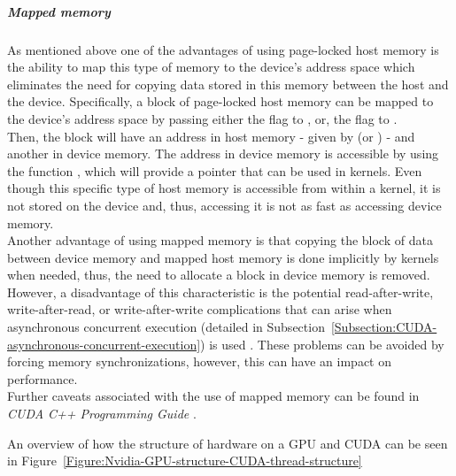 \subparagraph{Mapped memory}
As mentioned above one of the advantages of using page-locked host memory is the ability to map this type of memory to the device's address space which eliminates the need for copying data stored in this memory between the host and the device. Specifically, a block of page-locked host memory can be mapped to the device's address space by passing either the  flag to , or, the  flag to  \cite{NVIDIAMay2022}. \\
Then, the block will have an address in host memory - given by  (or ) - and another in device memory. The address in device memory is accessible by using the function , which will provide a pointer that can be used in kernels. Even though this specific type of host memory is accessible from within a kernel, it is not stored on the device and, thus, accessing it is not as fast as accessing device memory. \\
Another advantage of using mapped memory is that copying the block of data between device memory and mapped host memory is done implicitly by kernels when needed, thus, the need to allocate a block in device memory is removed. However, a disadvantage of this characteristic is the potential read-after-write, write-after-read, or write-after-write complications that can arise when asynchronous concurrent execution (detailed in Subsection~\ref{Subsection:CUDA-asynchronous-concurrent-execution}) is used \cite{NVIDIAMay2022}. These problems can be avoided by forcing memory synchronizations, however, this can have an impact on performance. \\
Further caveats associated with the use of mapped memory can be found in \emph{CUDA C++ Programming Guide} \cite{NVIDIAMay2022}.

\par An overview of how the structure of hardware on a GPU and CUDA can be seen in Figure~\ref{Figure:Nvidia-GPU-structure-CUDA-thread-structure}

